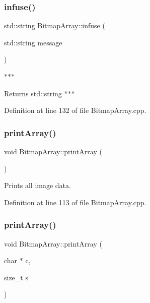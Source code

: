\subsubsection{\texorpdfstring{infuse()}{infuse()}}
{\footnotesize\ttfamily std\+::string Bitmap\+Array\+::infuse (\begin{DoxyParamCaption}\item[{std\+::string}]{message }\end{DoxyParamCaption})}



$\ast$$\ast$$\ast$ 

\begin{DoxyReturn}{Returns}
std\+::string $\ast$$\ast$$\ast$ 
\end{DoxyReturn}


Definition at line 132 of file Bitmap\+Array.\+cpp.

\mbox{\label{classBitmapArray_a0580ddeedca7f59fd8d43ec92e6bb4a1}} 
\subsubsection{\texorpdfstring{printArray()}{printArray()}\hspace{0.1cm}{\footnotesize\ttfamily [1/2]}}
{\footnotesize\ttfamily void Bitmap\+Array\+::print\+Array (\begin{DoxyParamCaption}{ }\end{DoxyParamCaption})}



Prints all image data. 



Definition at line 113 of file Bitmap\+Array.\+cpp.

\mbox{\label{classBitmapArray_a99a8a164e51e29407f24dab4752232c1}} 
\subsubsection{\texorpdfstring{printArray()}{printArray()}\hspace{0.1cm}{\footnotesize\ttfamily [2/2]}}
{\footnotesize\ttfamily void Bitmap\+Array\+::print\+Array (\begin{DoxyParamCaption}\item[{char $\ast$}]{c,  }\item[{size\+\_\+t}]{s }\end{DoxyParamCaption})\hspace{0.3cm}{\ttfamily [private]}}



